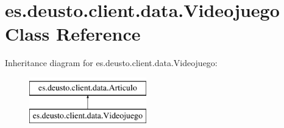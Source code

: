 \hypertarget{classes_1_1deusto_1_1client_1_1data_1_1_videojuego}{}\section{es.\+deusto.\+client.\+data.\+Videojuego Class Reference}
\label{classes_1_1deusto_1_1client_1_1data_1_1_videojuego}
Inheritance diagram for es.\+deusto.\+client.\+data.\+Videojuego\+:\begin{figure}[H]
\begin{center}
\leavevmode
\includegraphics[height=2.000000cm]{classes_1_1deusto_1_1client_1_1data_1_1_videojuego}
\end{center}
\end{figure}
